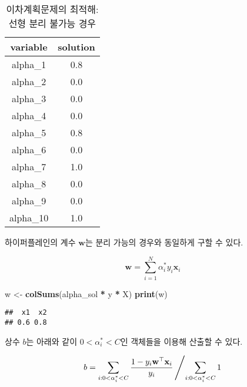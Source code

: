 \documentclass[]{book}
\newenvironment{Shaded}{\begin{snugshade}}{\end{snugshade}}
\newcommand{\DecValTok}[1]{\textcolor[rgb]{0.00,0.00,0.81}{#1}}
\newcommand{\KeywordTok}[1]{\textcolor[rgb]{0.13,0.29,0.53}{\textbf{#1}}}
\newcommand{\NormalTok}[1]{#1}
\newcommand{\OperatorTok}[1]{\textcolor[rgb]{0.81,0.36,0.00}{\textbf{#1}}}
\newcommand{\StringTok}[1]{\textcolor[rgb]{0.31,0.60,0.02}{#1}}
\begin{document}
\begin{table}[t]

\caption{\label{tab:svm-inseparable-alpha}이차계획문제의 최적해: 선형 분리 불가능 경우}
\centering
\begin{tabular}{cc}
\toprule
variable & solution\\
\midrule
alpha\_1 & 0.8\\
alpha\_2 & 0.0\\
alpha\_3 & 0.0\\
alpha\_4 & 0.0\\
alpha\_5 & 0.8\\
\addlinespace
alpha\_6 & 0.0\\
alpha\_7 & 1.0\\
alpha\_8 & 0.0\\
alpha\_9 & 0.0\\
alpha\_10 & 1.0\\
\bottomrule
\end{tabular}
\end{table}

하이퍼플레인의 계수 \(\mathbf{w}\)는 분리 가능의 경우와 동일하게 구할 수 있다.

\begin{equation*}
\mathbf{w} = \sum_{i = 1}^{N} \alpha_{i}^{*} y_{i} \mathbf{x}_{i}
\end{equation*}

\begin{Shaded}
\begin{Highlighting}[]
\NormalTok{w <-}\StringTok{ }\KeywordTok{colSums}\NormalTok{(alpha_sol }\OperatorTok{*}\StringTok{ }\NormalTok{y }\OperatorTok{*}\StringTok{ }\NormalTok{X)}
\KeywordTok{print}\NormalTok{(w)}
\end{Highlighting}
\end{Shaded}

\begin{verbatim}
##  x1  x2 
## 0.6 0.8
\end{verbatim}

상수 \(b\)는 아래와 같이 \(0 < \alpha_{i}^{*} < C\)인 객체들을 이용해 산출할 수 있다.

\begin{equation*}
b = \sum_{i: 0 < \alpha_{i}^{*} < C} \frac{1 - y_{i} \mathbf{w}^{\top} \mathbf{x}_{i}}{y_{i}} \left/ \sum_{i: 0 < \alpha_{i}^{*} < C} 1 \right. 
\end{equation*}

\begin{Shaded}
\end{Shaded}
\end{document}
